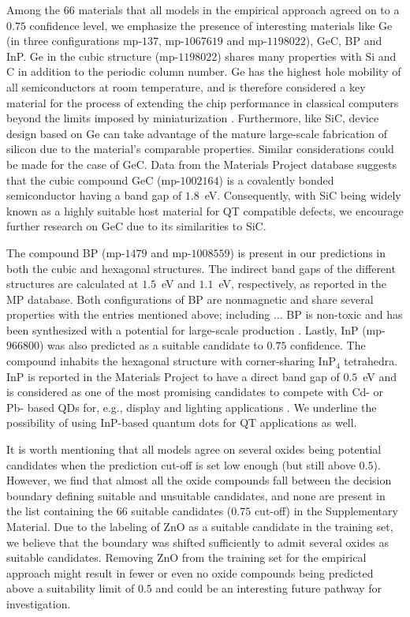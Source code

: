 \documentclass[superscriptaddress,unsortedaddress,
 amsmath,amssymb,
 aps,
]{revtex4-2}
\begin{document}
Among the $66$ materials that all models in the empirical approach agreed on to a $0.75$ confidence level, we emphasize the presence of interesting materials like Ge (in three configurations mp-$137$, mp-$1067619$ and mp-$1198022$), GeC, BP and InP. Ge in the cubic structure (mp-$1198022$) shares many properties with Si and C in addition to the periodic column number. 
Ge has the highest hole mobility of all semiconductors at room temperature, and is therefore considered a key material for the process of extending the chip performance in classical computers beyond the limits imposed by miniaturization \cite{Scappucci2020}. Furthermore, like SiC, device design based on Ge can take advantage of the mature large-scale fabrication of silicon due to the material's comparable properties.  
%
Similar considerations could be made for the case of GeC. 
Data from the Materials Project database suggests that the cubic compound GeC (mp-$1002164$) is a covalently bonded semiconductor having a band gap of $1.8$~eV. 
Consequently, with SiC being widely known as a highly suitable host material for QT compatible defects, we encourage further research on GeC due to its similarities to SiC. 

The compound BP (mp-$1479$ and mp-$1008559$) is present in our predictions in both the cubic and hexagonal structures. The indirect band gaps of the different structures are calculated at $1.5$~eV and $1.1$~eV, respectively, as reported in the MP database. Both configurations of BP are nonmagnetic and share several properties with the entries mentioned above; including ... BP is non-toxic and has been synthesized with a potential for large-scale production \cite{MukhanovVladimirA2016Umso}. 
Lastly, InP (mp-$966800$) was also predicted as a suitable candidate to $0.75$ confidence. The compound inhabits the hexagonal structure with corner-sharing InP$_4$ tetrahedra. InP is reported in the Materials Project to have a direct band gap of $0.5$~eV and is considered as one of the most promising candidates to compete with Cd- or Pb- based QDs for, e.g., display and lighting applications  \cite{Zhang2020a, Won2019}. 
We underline the possibility of using InP-based quantum dots for QT applications as well.  


It is worth mentioning that all models agree on several oxides being potential candidates when the prediction cut-off is set low enough (but still above $0.5$). However, we find that almost all the oxide compounds fall between the decision boundary defining suitable and unsuitable candidates, and none are present in the list containing the $66$ suitable candidates ($0.75$ cut-off) in the Supplementary Material. Due to the labeling of ZnO as a suitable candidate in the training set, we believe that the boundary was shifted sufficiently to admit several oxides as suitable candidates. 
Removing ZnO from the training set for the empirical approach might result in fewer or even no oxide compounds being predicted above a suitability limit of $0.5$ and could be an interesting future pathway for investigation. 
\end{document}
